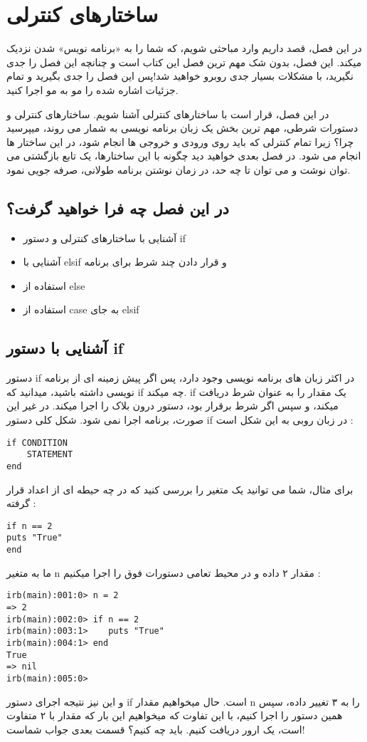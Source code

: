 \documentclass[11pt]{article}
\begin{document}
\section{ساختارهای کنترلی}
در این فصل، قصد داریم وارد مباحثی شویم، که شما را به «برنامه نویس» شدن نزدیک میکند. این فصل، بدون شک مهم ترین فصل این کتاب است و چنانچه این فصل را جدی نگیرید، با مشکلات بسیار جدی روبرو خواهید شد!پس این فصل را جدی بگیرید و تمام جزئیات اشاره شده را مو به مو اجرا کنید. 

در این فصل، قرار است با ساختارهای کنترلی آشنا شویم. ساختارهای کنترلی و دستورات شرطی، مهم ترین بخش یک زبان برنامه نویسی به شمار می روند، میپرسید چرا؟ زیرا تمام کنترلی که باید روی ورودی و خروجی ها انجام شود، در این ساختار ها انجام می شود. در فصل بعدی خواهید دید چگونه با این ساختارها، یک تابع بازگشتی می توان نوشت و می توان تا چه حد، در زمان نوشتن برنامه طولانی، صرفه جویی نمود. 

\subsection{در این فصل چه فرا خواهید گرفت؟}
\begin{itemize}
\item آشنایی با ساختارهای کنترلی و دستور if
\item آشنایی با elsif و قرار دادن چند شرط برای برنامه
\item استفاده از else 
\item استفاده از case به جای elsif
\end{itemize}
\subsection{آشنایی با دستور if }
دستور if در اکثر زبان های برنامه نویسی وجود دارد، پس اگر پیش زمینه ای از برنامه نویسی داشته باشید، میدانید که if چه میکند. if یک مقدار را به عنوان شرط دریافت میکند، و سپس اگر شرط برقرار بود، دستور درون بلاک را اجرا میکند. در غیر این صورت، برنامه اجرا نمی شود. شکل کلی دستور if در زبان روبی به این شکل است :
\begin{latin}
\begin{verbatim}
if CONDITION
	STATEMENT
end
\end{verbatim}
\end{latin}
برای مثال، شما می توانید یک متغیر را بررسی کنید که در چه حیطه ای از اعداد قرار گرفته :
\begin{latin}
\begin{verbatim}
if n == 2
puts "True"
end
\end{verbatim}
\end{latin}
ما به متغیر n مقدار ۲ داده و در محیط تعامی دستورات فوق را اجرا میکنیم :
\begin{latin}
\begin{verbatim}
irb(main):001:0> n = 2
=> 2
irb(main):002:0> if n == 2
irb(main):003:1>    puts "True"
irb(main):004:1> end
True
=> nil
irb(main):005:0>
\end{verbatim}
\end{latin}
و این نیز نتیجه اجرای دستور if است. حال میخواهیم مقدار n را به ۳ تغییر داده، سپس همین دستور را اجرا کنیم، با این تفاوت که میخواهیم این بار که مقدار با ۲ متفاوت است، یک ارور دریافت کنیم. باید چه کنیم؟ قسمت بعدی جواب شماست!
\end{document}
